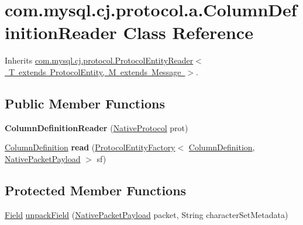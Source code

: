 \hypertarget{classcom_1_1mysql_1_1cj_1_1protocol_1_1a_1_1_column_definition_reader}{}\section{com.\+mysql.\+cj.\+protocol.\+a.\+Column\+Definition\+Reader Class Reference}
\label{classcom_1_1mysql_1_1cj_1_1protocol_1_1a_1_1_column_definition_reader}


Inherits \mbox{\hyperlink{interfacecom_1_1mysql_1_1cj_1_1protocol_1_1_protocol_entity_reader}{com.\+mysql.\+cj.\+protocol.\+Protocol\+Entity\+Reader$<$ T extends Protocol\+Entity, M extends Message $>$}}.

\subsection*{Public Member Functions}
\begin{DoxyCompactItemize}
\item 
\mbox{\label{classcom_1_1mysql_1_1cj_1_1protocol_1_1a_1_1_column_definition_reader_a8796691e9ca4bbf48f6f9d4b98cfa14c}} 
{\bfseries Column\+Definition\+Reader} (\mbox{\hyperlink{classcom_1_1mysql_1_1cj_1_1protocol_1_1a_1_1_native_protocol}{Native\+Protocol}} prot)
\item 
\mbox{\label{classcom_1_1mysql_1_1cj_1_1protocol_1_1a_1_1_column_definition_reader_a1655d4c72f8e621876807e32a501eadc}} 
\mbox{\hyperlink{interfacecom_1_1mysql_1_1cj_1_1protocol_1_1_column_definition}{Column\+Definition}} {\bfseries read} (\mbox{\hyperlink{interfacecom_1_1mysql_1_1cj_1_1protocol_1_1_protocol_entity_factory}{Protocol\+Entity\+Factory}}$<$ \mbox{\hyperlink{interfacecom_1_1mysql_1_1cj_1_1protocol_1_1_column_definition}{Column\+Definition}}, \mbox{\hyperlink{classcom_1_1mysql_1_1cj_1_1protocol_1_1a_1_1_native_packet_payload}{Native\+Packet\+Payload}} $>$ sf)
\end{DoxyCompactItemize}
\subsection*{Protected Member Functions}
\begin{DoxyCompactItemize}
\item 
\mbox{\hyperlink{classcom_1_1mysql_1_1cj_1_1result_1_1_field}{Field}} \mbox{\hyperlink{classcom_1_1mysql_1_1cj_1_1protocol_1_1a_1_1_column_definition_reader_a544a33df60bf2153e61c6c743e3aefd7}{unpack\+Field}} (\mbox{\hyperlink{classcom_1_1mysql_1_1cj_1_1protocol_1_1a_1_1_native_packet_payload}{Native\+Packet\+Payload}} packet, String character\+Set\+Metadata)
\end{DoxyCompactItemize}


